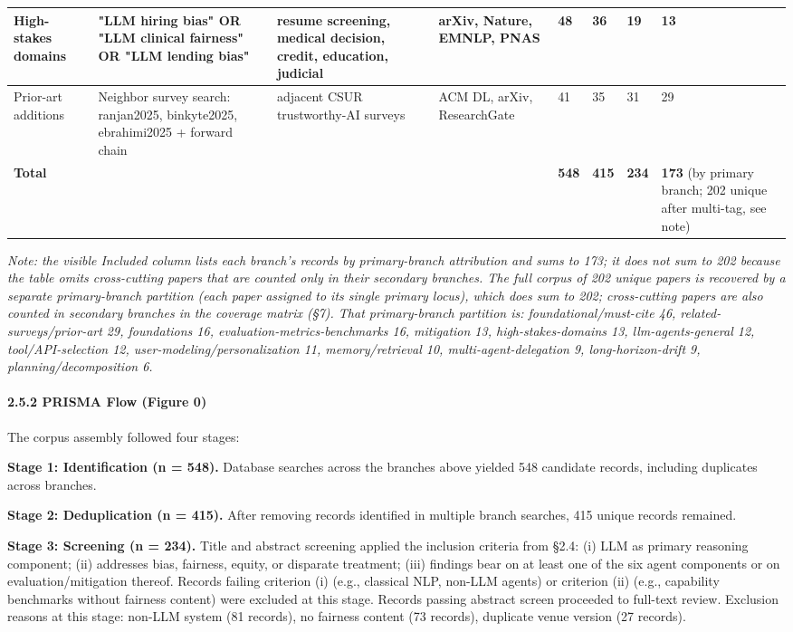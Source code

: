 \documentclass[10pt]{article}
\begin{document}
\begin{center}
\begin{longtable}{|p{}|p{}|p{}|p{}|p{}|p{}|p{}|p{}|}
High-stakes domains & "LLM hiring bias" OR "LLM clinical fairness" OR "LLM lending bias" & resume screening, medical decision, credit, education, judicial & arXiv, Nature, EMNLP, PNAS & 48 & 36 & 19 & 13 \\ \hline
Prior-art additions & Neighbor survey search: ranjan2025, binkyte2025, ebrahimi2025 + forward chain & adjacent CSUR trustworthy-AI surveys & ACM DL, arXiv, ResearchGate & 41 & 35 & 31 & 29 \\ \hline
\textbf{Total} &  &  &  & \textbf{548} & \textbf{415} & \textbf{234} & \textbf{173} (by primary branch; 202 unique after multi-tag, see note) \\ \hline
\end{longtable}\end{center}

\emph{Note: the visible Included column lists each branch's records by primary-branch attribution and sums to 173; it does not sum to 202 because the table omits cross-cutting papers that are counted only in their secondary branches. The full corpus of 202 unique papers is recovered by a separate primary-branch partition (each paper assigned to its single primary locus), which does sum to 202; cross-cutting papers are also counted in secondary branches in the coverage matrix (\S{}7). That primary-branch partition is: foundational/must-cite 46, related-surveys/prior-art 29, foundations 16, evaluation-metrics-benchmarks 16, mitigation 13, high-stakes-domains 13, llm-agents-general 12, tool/API-selection 12, user-modeling/personalization 11, memory/retrieval 10, multi-agent-delegation 9, long-horizon-drift 9, planning/decomposition 6.}

\paragraph*{2.5.2 PRISMA Flow (Figure 0)}

The corpus assembly followed four stages:

\textbf{Stage 1: Identification (n = 548).} Database searches across the branches above yielded 548 candidate records, including duplicates across branches.

\textbf{Stage 2: Deduplication (n = 415).} After removing records identified in multiple branch searches, 415 unique records remained.

\textbf{Stage 3: Screening (n = 234).} Title and abstract screening applied the inclusion criteria from \S{}2.4: (i) LLM as primary reasoning component; (ii) addresses bias, fairness, equity, or disparate treatment; (iii) findings bear on at least one of the six agent components or on evaluation/mitigation thereof. Records failing criterion (i) (e.g., classical NLP, non-LLM agents) or criterion (ii) (e.g., capability benchmarks without fairness content) were excluded at this stage. Records passing abstract screen proceeded to full-text review. Exclusion reasons at this stage: non-LLM system (81 records), no fairness content (73 records), duplicate venue version (27 records).
\end{document}
